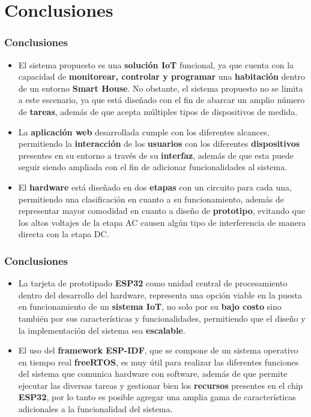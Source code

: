 \section{Conclusiones}
\begin{frame}[t]
\frametitle{Conclusiones}
\small
\begin{itemize}
	\item El sistema propuesto es una \textbf{solución IoT} funcional, ya que cuenta con la capacidad de \textbf{monitorear, controlar y programar} una \textbf{habitación} dentro de un entorno \textbf{Smart House}. No obstante, el sistema propuesto no se limita a este escenario, ya que está diseñado con el fin de abarcar un amplio número de \textbf{tareas}, además de que acepta múltiples tipos de dispositivos de medida.
	
	\item La \textbf{aplicación web} desarrollada cumple con los diferentes alcances, permitiendo la \textbf{interacción} de los \textbf{usuarios} con los diferentes \textbf{dispositivos} presentes en su entorno a través de su \textbf{interfaz}, además de que esta puede seguir siendo ampliada con el fin de adicionar funcionalidades al sistema.
	
	\item El \textbf{hardware} está diseñado en dos \textbf{etapas} con un circuito para cada una, permitiendo una clasificación en cuanto a su funcionamiento, además de representar mayor comodidad en cuanto a diseño de \textbf{prototipo}, evitando que los altos voltajes de la etapa AC causen algún tipo de interferencia de manera directa con la etapa DC.
	
\end{itemize}
\end{frame}

\begin{frame}[t]
\frametitle{Conclusiones}
\begin{itemize}
	\item La tarjeta de prototipado \textbf{ESP32} como unidad central de procesamiento dentro del desarrollo del hardware, representa una opción viable en la puesta en funcionamiento de un \textbf{sistema IoT}, no solo por su \textbf{bajo costo} sino también por sus características y funcionalidades, permitiendo que el diseño y la implementación del sistema sea \textbf{escalable}.
	
	\item El uso del \textbf{framework ESP-IDF}, que se compone de un sistema operativo en tiempo real \textbf{freeRTOS}, es muy útil para realizar las diferentes funciones del sistema que comunica hardware con software, además de que permite ejecutar las diversas tareas y gestionar bien los \textbf{recursos} presentes en el chip \textbf{ESP32}, por lo tanto es posible agregar una amplia gama de características adicionales a la funcionalidad del sistema.
\end{itemize}
\end{frame}